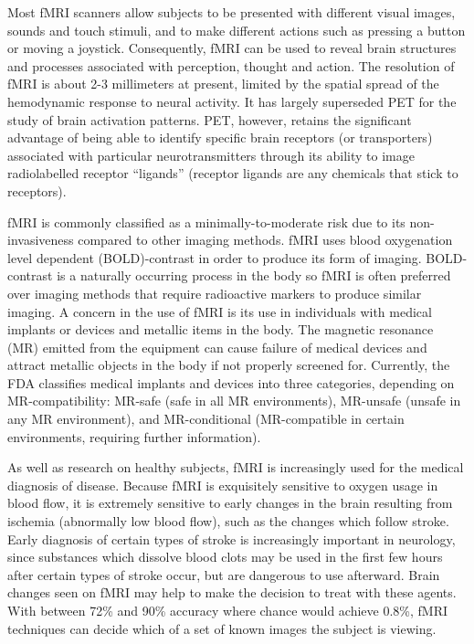 Most fMRI scanners allow subjects to be presented with different visual images, sounds and touch stimuli, and to make different actions such as pressing a button or moving a joystick. Consequently, fMRI can be used to reveal brain structures and processes associated with perception, thought and action. The resolution of fMRI is about 2-3 millimeters at present, limited by the spatial spread of the hemodynamic response to neural activity. It has largely superseded PET for the study of brain activation patterns. PET, however, retains the significant advantage of being able to identify specific brain receptors (or transporters) associated with particular neurotransmitters through its ability to image radiolabelled receptor ``ligands'' (receptor ligands are any chemicals that stick to receptors).

fMRI is commonly classified as a minimally-to-moderate risk due to its non-invasiveness compared to other imaging methods. fMRI uses blood oxygenation level dependent (BOLD)-contrast in order to produce its form of imaging. BOLD-contrast is a naturally occurring process in the body so fMRI is often preferred over imaging methods that require radioactive markers to produce similar imaging. A concern in the use of fMRI is its use in individuals with medical implants or devices and metallic items in the body. The magnetic resonance (MR) emitted from the equipment can cause failure of medical devices and attract metallic objects in the body if not properly screened for. Currently, the FDA classifies medical implants and devices into three categories, depending on MR-compatibility: MR-safe (safe in all MR environments), MR-unsafe (unsafe in any MR environment), and MR-conditional (MR-compatible in certain environments, requiring further information).

As well as research on healthy subjects, fMRI is increasingly used for the medical diagnosis of disease. Because fMRI is exquisitely sensitive to oxygen usage in blood flow, it is extremely sensitive to early changes in the brain resulting from ischemia (abnormally low blood flow), such as the changes which follow stroke. Early diagnosis of certain types of stroke is increasingly important in neurology, since substances which dissolve blood clots may be used in the first few hours after certain types of stroke occur, but are dangerous to use afterward. Brain changes seen on fMRI may help to make the decision to treat with these agents. With between 72\% and 90\% accuracy where chance would achieve 0.8\%, fMRI techniques can decide which of a set of known images the subject is viewing.

